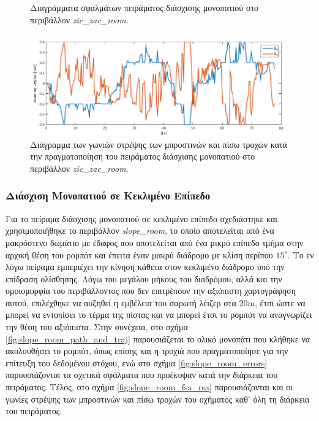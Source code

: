 \begin{figure}[!ht]
	\caption{Διαγράμματα σφαλμάτων πειράματος διάσχισης μονοπατιού στο περιβάλλον \textit{zic{\_}zac{\_}room.}}
	\label{fig:zic_zac_room_errors}
\end{figure}

\begin{figure}[!ht]
	\centering
	\includegraphics[width=0.9\linewidth]{Chapters/Chapter5/Figures/ptc_experiments/plots/zic_zac_room/fsa_rsa.png}
	\caption{Διάγραμμα των γωνιών στρέψης των μπροστινών και πίσω τροχών κατά την πραγματοποίηση του πειράματος διάσχισης μονοπατιού στο περιβάλλον \textit{zic{\_}zac{\_}room.}}
	\label{fig:zic_zac_room_fsa_rsa}
\end{figure}

\subsubsection{Διάσχιση Μονοπατιού σε Κεκλιμένο Επίπεδο}
Για το πείραμα διάσχισης μονοπατιού σε κεκλιμένο επίπεδο σχεδιάστηκε και χρησιμοποιήθηκε το περιβάλλον \textit{slope{\_}room}, το οποίο αποτελείται από ένα μακρόστενο δωμάτιο με έδαφος που αποτελείται από ένα μικρό επίπεδο τμήμα στην αρχική θέση του ρομπότ και έπειτα έναν μακρύ διάδρομο με κλίση περίπου $15^o$. Το εν λόγω πείραμα εμπεριέχει την κίνηση κάθετα στον κεκλιμένο διάδρομο υπό την επίδραση ολίσθησης. Λόγω του μεγάλου μήκους του διαδρόμου, αλλά και την ομοιομορφία του περιβάλλοντος που δεν επιτρέπουν την αξιόπιστη χαρτογράφηση αυτού, επιλέχθηκε να αυξηθεί η εμβέλεια του σαρωτή λέιζερ στα 20m, έτσι ώστε να μπορεί να εντοπίσει το τέρμα της πίστας και να μπορεί έτσι το ρομπότ να αναγνωρίζει την θέση του αξιόπιστα. Στην συνέχεια, στο σχήμα \ref{fig:slope_room_path_and_traj} παρουσιάζεται το ολικό μονοπάτι που κλήθηκε να ακολουθήσει το ρομπότ, όπως επίσης και η τροχιά που πραγματοποίησε για την επίτευξη του δεδομένου στόχου, ενώ στο σχήμα \ref{fig:slope_room_errors} παρουσιάζονται τα σχετικά σφάλματα που προέκυψαν κατά την διάρκεια του πειράματος. Τέλος, στο σχήμα \ref{fig:slope_room_fsa_rsa} παρουσιάζονται και οι γωνίες στρέψης των μπροστινών και πίσω τροχών του οχήματος καθ' όλη τη διάρκεια του πειράματος.

